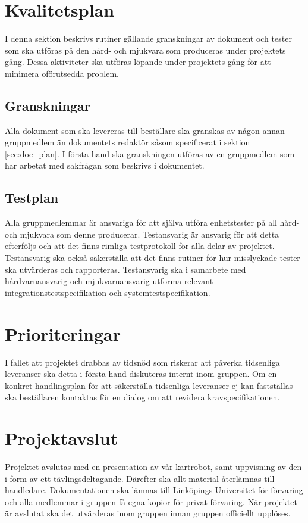 \documentclass[a4paper,11pt]{article}
\begin{document}
\section{Kvalitetsplan}
I denna sektion beskrivs rutiner gällande granskningar av dokument och tester som ska utföras på den hård- och mjukvara som produceras under projektets gång. Dessa aktiviteter ska utföras löpande under projektets gång för att minimera oförutsedda problem.

\subsection{Granskningar}
Alla dokument som ska levereras till beställare ska granskas av någon annan gruppmedlem än dokumentets redaktör såsom specificerat i sektion \ref{sec:doc_plan}. I första hand ska granskningen utföras av en gruppmedlem som har arbetat med sakfrågan som beskrivs i dokumentet.

\subsection{Testplan}
Alla gruppmedlemmar är ansvariga för att själva utföra enhetstester på all hård- och mjukvara som denne producerar. Testansvarig är ansvarig för att detta efterföljs och att det finns rimliga testprotokoll för alla delar av projektet. Testansvarig ska också säkerställa att det finns rutiner för hur misslyckade tester ska utvärderas och rapporteras. Testansvarig ska i samarbete med hårdvaruansvarig och mjukvaruansvarig utforma relevant integrationstestspecifikation och systemtestspecifikation.


\section{Prioriteringar}
I fallet att projektet drabbas av tidsnöd som riskerar att påverka tidsenliga leveranser ska detta i första hand diskuteras internt inom gruppen. Om en konkret handlingsplan för att säkerställa tidsenliga leveranser ej kan fastställas ska beställaren kontaktas för en dialog om att revidera kravspecifikationen.

\section{Projektavslut}
Projektet avslutas med en presentation av vår kartrobot, samt uppvisning av den i form av ett tävlingsdeltagande. Därefter ska allt material återlämnas till handledare. Dokumentationen ska lämnas till Linköpings Universitet för förvaring och alla medlemmar i gruppen få egna kopior för privat förvaring. När projektet är avslutat ska det utvärderas inom gruppen innan gruppen officiellt upplöses.

\clearpage

\begin{appendices}

\end{appendices}
\clearpage
{}	%
\printbibliography
\end{document}
